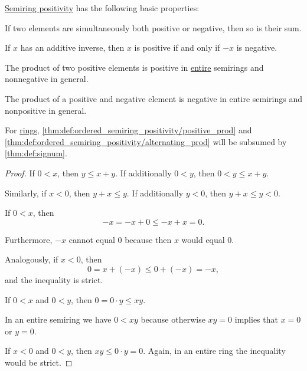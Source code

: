 \begin{proposition}\label{thm:def:ordered_semiring_positivity}
  \hyperref[def:ordered_semiring_positivity]{Semiring positivity} has the following basic properties:
  \begin{thmenum}
     If two elements are simultaneously both positive or negative, then so is their sum.

     If \( x \) has an additive inverse, then \( x \) is positive if and only if \( -x \) is negative.

     The product of two positive elements is positive in \hyperref[def:entire_semiring]{entire} semirings and nonnegative in general.

     The product of a positive and negative element is negative in entire semirings and nonpositive in general.
  \end{thmenum}
\end{proposition}
\begin{comments}
  \item For \hyperref[def:ring]{rings}, \cref{thm:def:ordered_semiring_positivity/positive_prod} and \cref{thm:def:ordered_semiring_positivity/alternating_prod} will be subsumed by \cref{thm:def:signum}.
\end{comments}
\begin{proof}
   If \( 0 < x \), then \( y \leq x + y \). If additionally \( 0 < y \), then \( 0 < y \leq x + y \).

  Similarly, if \( x < 0 \), then \( y + x \leq y \). If additionally \( y < 0 \), then \( y + x \leq y < 0 \).

   If \( 0 < x \), then
  \begin{equation*}
    -x = -x + 0 \leq -x + x = 0.
  \end{equation*}

  Furthermore, \( -x \) cannot equal \( 0 \) because then \( x \) would equal \( 0 \).

  Analogously, if \( x < 0 \), then
  \begin{equation*}
    0 = x + (-x) \leq 0 + (-x) = -x,
  \end{equation*}
  and the inequality is strict.

   If \( 0 < x \) and \( 0 < y \), then \( 0 = 0 \cdot y \leq xy \).

  In an entire semiring we have \( 0 < xy \) because otherwise \( xy = 0 \) implies that \( x = 0 \) or \( y = 0 \).

   If \( x < 0 \) and \( 0 < y \), then \( xy \leq 0 \cdot y = 0 \). Again, in an entire ring the inequality would be strict.
\end{proof}

